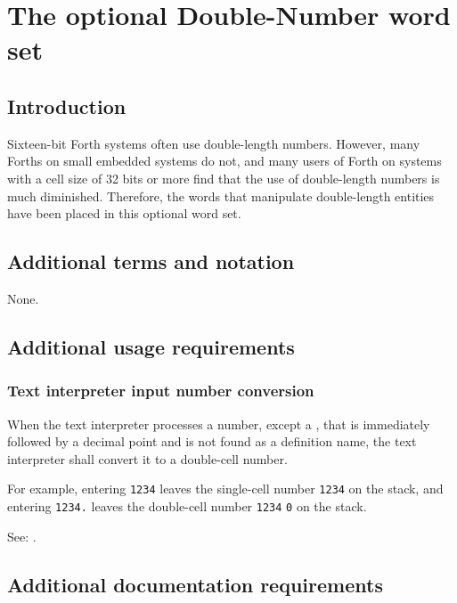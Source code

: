 \chapter{The optional Double-Number word set} %

\section{Introduction} %

Sixteen-bit Forth systems often use double-length numbers. However,
many Forths on small embedded systems do not, and many users of Forth
on systems with a cell size of 32 bits or more find that the use of
double-length numbers is much diminished. Therefore, the words that
manipulate double-length entities have been placed in this optional
word set.

\section{Additional terms and notation} %

None.

\section{Additional usage requirements} %

\subsection{Text interpreter input number conversion} %

When the text interpreter processes a number, except a ,
that is immediately followed by a decimal point and is not found
as a definition name, the text interpreter shall convert it to a
double-cell number.

For example, entering  \texttt{1234} leaves the
single-cell number \texttt{1234} on the stack, and entering
 \texttt{1234.} leaves the double-cell number
\texttt{1234} \texttt{0} on the stack.

See: .


\section{Additional documentation requirements} %

